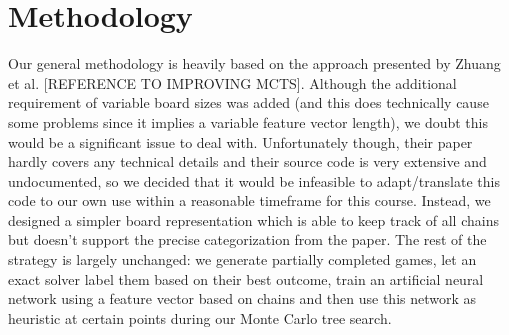 \section{Methodology}

Our general methodology is heavily based on the approach presented by Zhuang et al. [REFERENCE TO IMPROVING MCTS]. Although the additional requirement of variable board sizes was added (and this does technically cause some problems since it implies a variable feature vector length), we doubt this would be a significant issue to deal with. Unfortunately though, their paper hardly covers any technical details and their source code is very extensive and undocumented, so we decided that it would be infeasible to adapt/translate this code to our own use within a reasonable timeframe for this course. Instead, we designed a simpler board representation which is able to keep track of all chains but doesn't support the precise categorization from the paper. The rest of the strategy is largely unchanged: we generate partially completed games, let an exact solver label them based on their best outcome, train an artificial neural network using a feature vector based on chains and then use this network as heuristic at certain points during our Monte Carlo tree search.




